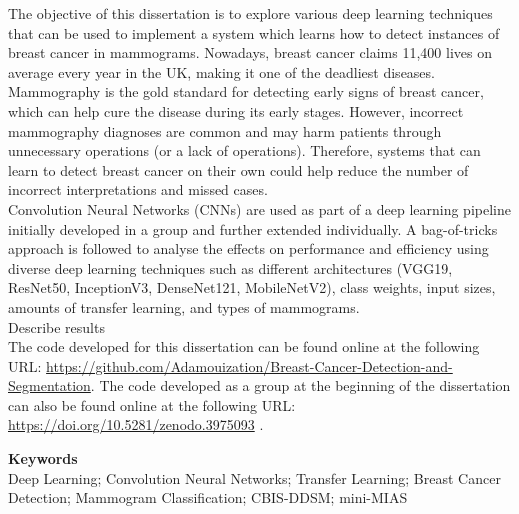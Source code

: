 

The objective of this dissertation is to explore various deep learning techniques that can be used to implement a system which learns how to detect instances of breast cancer in mammograms. Nowadays, breast cancer claims 11,400 lives on average every year in the UK, making it one of the deadliest diseases. Mammography is the gold standard for detecting early signs of breast cancer, which can help cure the disease during its early stages. However, incorrect mammography diagnoses are common and may harm patients through unnecessary operations (or a lack of operations). Therefore, systems that can learn to detect breast cancer on their own could help reduce the number of incorrect interpretations and missed cases.\\

Convolution Neural Networks (CNNs) are used as part of a deep learning pipeline initially developed in a group and further extended individually. A bag-of-tricks approach is followed to analyse the effects on performance and efficiency using diverse deep learning techniques such as different architectures (VGG19, ResNet50, InceptionV3, DenseNet121, MobileNetV2), class weights, input sizes, amounts of transfer learning, and types of mammograms.\\

Describe results\\

The code developed for this dissertation can be found online at the following URL: \url{https://github.com/Adamouization/Breast-Cancer-Detection-and-Segmentation}. The code developed as a group at the beginning of the dissertation can also be found online at the following URL: \url{https://doi.org/10.5281/zenodo.3975093} \citep{adam_jaamour_2020_3975093}.

\vspace{12mm}
\begin{center}

\textbf{Keywords}\\
\vspace{5mm}
Deep Learning; Convolution Neural Networks; Transfer Learning; Breast Cancer Detection; Mammogram Classification; CBIS-DDSM; mini-MIAS

\end{center}

